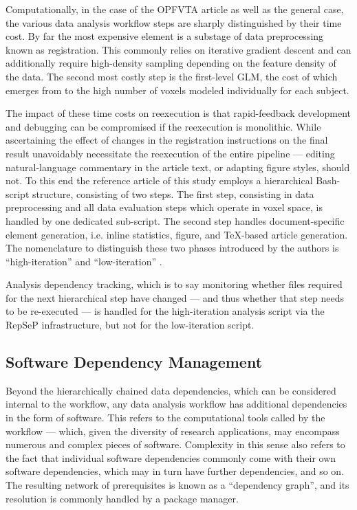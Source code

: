 Computationally, in the case of the OPFVTA article as well as the general case, the various data analysis workflow steps are sharply distinguished by their time cost.
By far the most expensive element is a substage of data preprocessing known as registration.
This commonly relies on iterative gradient descent and can additionally require high-density sampling depending on the feature density of the data.
The second most costly step is the first-level GLM, the cost of which emerges from to the high number of voxels modeled individually for each subject.

The impact of these time costs on reexecution is that rapid-feedback development and debugging can be compromised if the reexecution is monolithic.
While ascertaining the effect of changes in the registration instructions on the final result unavoidably necessitate the reexecution of the entire pipeline — editing natural-language commentary in the article text, or adapting figure styles, should not.
To this end the reference article of this study employs a hierarchical Bash-script structure, consisting of two steps.
The first step, consisting in data preprocessing and all data evaluation steps which operate in voxel space, is handled by one dedicated sub-script.
The second step handles document-specific element generation, i.e. inline statistics, figure, and TeX-based article generation.
The nomenclature to distinguish these two phases introduced by the authors is “high-iteration” and “low-iteration” \cite{repsep}.

Analysis dependency tracking, which is to say monitoring whether files required for the next hierarchical step have changed — and thus whether that step needs to be re-executed — is handled for the high-iteration analysis script via the RepSeP infrastructure, but not for the low-iteration script.


\subsection{Software Dependency Management}

Beyond the hierarchically chained data dependencies, which can be considered internal to the workflow, any data analysis workflow has additional dependencies in the form of software.
This refers to the computational tools called by the workflow — which, given the diversity of research applications, may encompass numerous and complex pieces of software.
Complexity in this sense also refers to the fact that individual software dependencies commonly come with their own software dependencies, which may in turn have further dependencies, and so on.
The resulting network of prerequisites is known as a “dependency graph”, and its resolution is commonly handled by a package manager.


